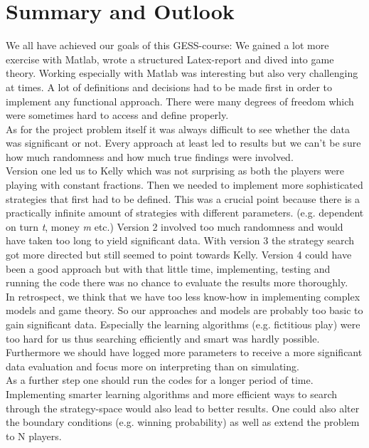 \documentclass[11pt]{article}
\begin{document}
\section{Summary and Outlook}
We all have achieved our goals of this GESS-course: We gained a lot more exercise with Matlab, wrote a structured Latex-report and dived into game theory. Working especially with Matlab was interesting but also very challenging at times. A lot of definitions and decisions had to be made first in order to implement any functional approach. There were many degrees of freedom which were sometimes hard to access and define properly.\\
As for the project problem itself it was always difficult to see whether the data was significant or not. Every approach at least led to results but we can't be sure how much randomness and how much true findings were involved.\\

Version one led us to Kelly which was not surprising as both the players were playing with constant fractions. Then we needed to implement more sophisticated strategies that first had to be defined. This was a crucial point because there is a practically infinite amount of strategies with different parameters. (e.g. dependent on turn \textit{t}, money \textit{m} etc.) Version 2 involved too much randomness and would have taken too long to yield significant data. With version 3 the strategy search got more directed but still seemed to point towards Kelly. Version 4 could have been a good approach but with that little time, implementing, testing and running the code there was no chance to evaluate the results more thoroughly. \\

In retrospect, we think that we have too less know-how in implementing complex models and game theory. So our approaches and models are probably too basic to gain significant data. Especially the learning algorithms (e.g. fictitious play) were too hard for us thus searching efficiently and smart was hardly possible. Furthermore we should have logged more parameters to receive a more significant data evaluation and focus more on interpreting than on simulating. \\

As a further step one should run the codes for a longer period of time. Implementing smarter learning algorithms and more efficient ways to search through the strategy-space would also lead to better results. One could also alter the boundary conditions (e.g. winning probability) as well as extend the problem to N players. \\
\end{document}
